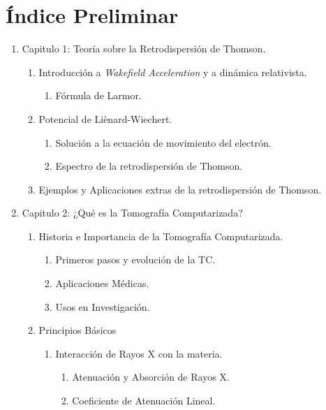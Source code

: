 \section{Índice Preliminar}


\begin{enumerate}
    \item Capitulo 1: Teoría sobre la Retrodispersión de Thomson.
    \begin{enumerate}
        \item Introducción a \textit{Wakefield Acceleration} y a dinámica relativista.
        \begin{enumerate}
            \item Fórmula de Larmor.
        \end{enumerate}
        \item Potencial de Liènard-Wiechert.
        \begin{enumerate}
            \item Solución a la ecuación de movimiento del electrón.
            \item Espectro de la retrodispersión de Thomson.
        \end{enumerate}
        \item Ejemplos y Aplicaciones extras de la retrodispersión de Thomson.
    \end{enumerate}
    \item Capitulo 2: ¿Qué es la Tomografía Computarizada?
    \begin{enumerate}
        \item Historia e Importancia de la Tomografía Computarizada.
        \begin{enumerate}
            \item Primeros pasos y evolución de la TC.
            \item Aplicaciones Médicas.
            \item Usos en Investigación.
        \end{enumerate}
        \item Principios Básicos
        \begin{enumerate}
            \item Interacción de Rayos X con la materia.
            \begin{enumerate}
                \item Atenuación y Absorción de Rayos X.
                \item Coeficiente de Atenuación Lineal.
            \end{enumerate}

\end{enumerate}
\end{enumerate}
\end{enumerate}
